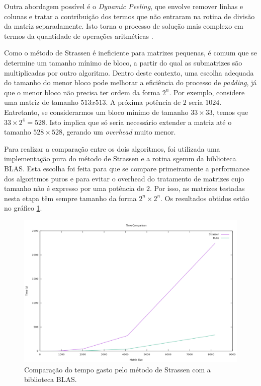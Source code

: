 \documentclass[12pt,a4paper,onecolumn]{article}
\begin{document}
Outra abordagem possível é o \emph{Dynamic Peeling}, que envolve remover linhas e colunas e tratar a contribuição dos termos que não entraram na rotina de divisão da matriz 
separadamente. Isto torna o processo de solução mais complexo em termos da quantidade de operações aritméticas \cite{Lederman}.

Como o método de Strassen é ineficiente para matrizes pequenas, é comum que se determine um tamanho mínimo de bloco, a partir do qual as submatrizes são multiplicadas por outro 
algoritmo. Dentro deste contexto, uma escolha adequada do tamanho do menor bloco pode melhorar a eficiência do processo de \emph{padding}, já que o menor bloco não precisa 
ter ordem da forma $2^n$. Por exemplo, considere uma matriz de tamanho $513 x 513$. A próxima potência de $2$ seria $1024$. Entretanto, se considerarmos um bloco mínimo de tamanho
$33 \times 33$, temos que $33 \times 2^4 = 528$. Isto implica que só seria necessário extender a matriz até o tamanho $528 \times 528$, gerando um \emph{overhead} muito menor.

Para realizar a comparação entre os dois algoritmos, foi utilizada uma implementação pura do método de Strassen e a rotina sgemm da biblioteca BLAS. Esta escolha foi feita 
para que se compare primeiramente a performance dos algoritmos puros e para evitar o overhead do tratamento de matrizes cujo tamanho não é expresso por uma potência de $2$.
Por isso, as matrizes testadas nesta etapa têm sempre tamanho da forma $2^n \times 2^n$. Os resultados obtidos estão no gráfico \ref{time_test}.

\begin{figure}[H]
\centering
\includegraphics[width=1\linewidth]
{./figures/plot_time_no_opt.pdf}
\caption{Comparação do tempo gasto pelo método de Strassen com a biblioteca BLAS.} 
\label{time_test}
\end{figure}
\end{document}
